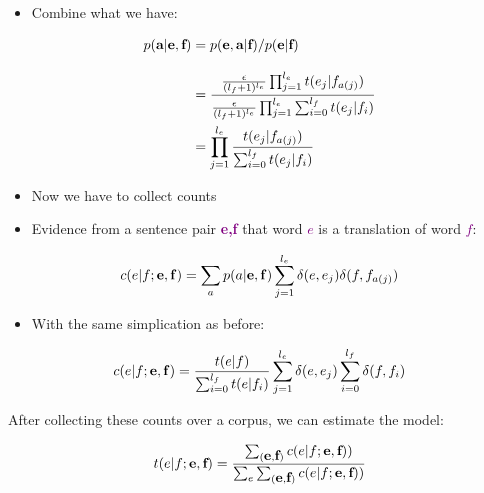 \documentclass[landscape]{slides}
\newcommand{\maths}[1]{\textcolor{purple}{#1}}
\begin{document}

\vspace{10mm}\begin{itemize}
\item Combine what we have:
\end{itemize}
\vspace{5mm}
\maths{\begin{equation*}
\begin{split}
p(\mbox{\bf a}|\mbox{\bf e},\mbox{\bf f}) &=
p(\mbox{\bf e},\mbox{\bf a}|\mbox{\bf f}) /
p(\mbox{\bf e}|\mbox{\bf f}) \\[3mm]
&= \frac{\frac{\epsilon}{(l_f+1)^{l_e}} \prod_{j=1}^{l_e}
  t(e_j|f_{a(j)})}{\frac{\epsilon}{(l_f+1)^{l_e}} \prod_{j=1}^{l_e} \sum_{i=0}^{l_f} t(e_j|f_i)} \\
&= \prod_{j=1}^{l_e} \frac{t(e_j|f_{a(j)})}{\sum_{i=0}^{l_f} t(e_j|f_i)}
\end{split}
\end{equation*}}



\begin{itemize}
\item Now we have to collect counts
\item Evidence from a sentence pair \maths{{\bf e,f}} that word \maths{$e$} is a
  translation of word \maths{$f$}:
\end{itemize}
\maths{\begin{equation*}
c(e|f;{\bf e},{\bf f}) = \sum_{a} 
p(a|{\bf e},{\bf f}) 
\sum_{j=1}^{l_e} \delta(e,e_j) \delta(f,f_{a(j)})
\end{equation*}}
\begin{itemize}
\item With the same simplication as before:
\end{itemize}
\maths{\begin{equation*}
c(e|f;{\bf e},{\bf f}) = \frac{t(e|f)}{\sum_{i=0}^{l_f} t(e|f_i)}
\sum_{j=1}^{l_e} \delta(e,e_j) \sum_{i=0}^{l_f} \delta(f,f_i)
\end{equation*}}



\vspace{30mm}
\begin{center}
After collecting these counts over a corpus, we can estimate the model:
\end{center}
\vspace{10mm}
\maths{\begin{equation*}
t(e|f;\mbox{\bf e},\mbox{\bf f}) = 
\frac{\sum_{(\mbox{\bf e},\mbox{\bf f})} c(e|f;\mbox{\bf e},\mbox{\bf f}))}
{\sum_e \sum_{(\mbox{\bf e},\mbox{\bf f})} c(e|f;\mbox{\bf e},\mbox{\bf f}))}
\end{equation*}}
\end{document}

